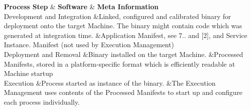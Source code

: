 \begin{DoxyItemize}
\begin{longtabu}
\endfirsthead
\hline
\endfoot
\hline
\rowcolor{\tableheadbgcolor}\textbf{ Process Step  }&\textbf{ Software  }&\textbf{ Meta Information   }\\
\endhead
Development and Integration  &Linked, configured and calibrated binary for deployment onto the target Machine. The binary might contain code which was generated at integration time.  &Application Manifest, see 7.. and \mbox{[}2\mbox{]}, and Service Instance. Manifest (not used by Execution Management)   \\
Deployment and Removal  &Binary installed on the target Machine.  &Processed Manifests, stored in a platform-\/specific format which is efficiently readable at Machine startup   \\
Execution  &Process started as instance of the binary.  &The Execution Management uses contents of the Processed Manifests to start up and configure each process individually.   \\
\end{longtabu}

\end{DoxyItemize}

 ~\newline

